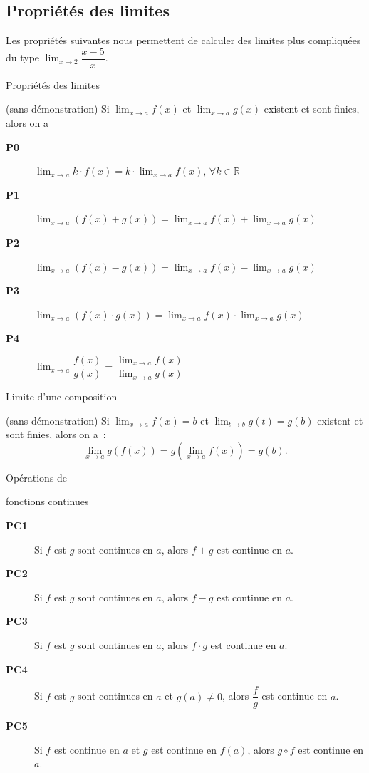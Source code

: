\documentclass[a4paper,12pt]{article}
\begin{document}
\subsection{Propriétés des limites}
\label{sec:proplim}
Les propriétés suivantes nous permettent de calculer des limites plus compliquées du type $\displaystyle{\lim_{x\rightarrow 2}\dfrac{x-5}{x}}$.
\smallskip
\begin{thm}[label=thm:limprop]
	Propriétés des limites

	(sans démonstration)
	\tcblower
Si $\displaystyle{\lim_{x\rightarrow a}f(x)}$ et $\displaystyle{\lim_{x\rightarrow a}g(x)}$ existent et sont finies, alors on a 
\noindent
\begin{description}
	\item[{\bfseries P0}] $\displaystyle{\lim_{x\rightarrow a}k\cdot f(x)=k\cdot \lim_{x\rightarrow a}f(x)},\, \forall k\in \mathbb{R}$ 
	\item[{\bfseries P1}] $\displaystyle{\lim_{x\rightarrow a}\left(f(x)+g(x)\right)=\lim_{x\rightarrow a}f(x)+\lim_{x\rightarrow a}g(x)}$ 
	\item[{\bfseries P2}] $\displaystyle{\lim_{x\rightarrow a}\left(f(x)-g(x)\right)=\lim_{x\rightarrow a}f(x)-\lim_{x\rightarrow a}g(x)}$ 
	\item[{\bfseries P3}] $\displaystyle{\lim_{x\rightarrow a}\left(f(x)\cdot g(x)\right)=\lim_{x\rightarrow a}f(x)\cdot \lim_{x\rightarrow a}g(x)}$ 
	\item[{\bfseries P4}] $\displaystyle{\lim_{x\rightarrow a}\dfrac{f(x)}{g(x)}=\dfrac{\lim_{x\rightarrow a}f(x)}{\lim_{x\rightarrow a}g(x)}}$ 
\end{description}
\end{thm}
\begin{thm}[label=thm:compo]
	Limite d'une composition

	(sans démonstration)
	\tcblower
	Si $\displaystyle{\lim_{x\rightarrow a}f(x)=b}$ et $\displaystyle{\lim_{t\rightarrow b}g(t)=g(b)}$ existent et sont finies, alors on a~:
	\[\lim_{x\rightarrow a}g(f(x))=g(\lim_{x\rightarrow a }f(x))=g(b).\] 
\end{thm}
\begin{coro}
Opérations de

fonctions continues
	\tcblower
	\noindent\begin{description}
		\item[{\bfseries PC1}] Si $f$ est $g$ sont continues en $a$, alors $f+g$ est continue en $a$.  
		\item[{\bfseries PC2}] Si $f$ est $g$ sont continues en $a$, alors $f-g$ est continue en $a$.  
		\item[{\bfseries PC3}] Si $f$ est $g$ sont continues en $a$, alors $f\cdot g$ est continue en $a$.  
		\item[{\bfseries PC4}] Si $f$ est $g$ sont continues en $a$ et $g(a)\neq 0$, alors $\dfrac{f}{g}$ est continue en $a$.  
		\item[{\bfseries PC5}] Si $f$ est continue en $a$ et $g$ est continue en $f(a)$, alors $g\circ f$ est continue en $a$. 
	\end{description}
\end{coro}
\end{document}
